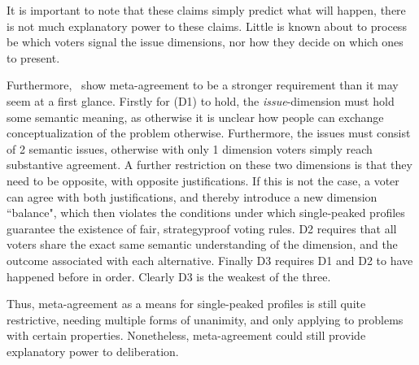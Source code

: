 It is important to note that these claims simply predict what will happen, there is not much explanatory power to these claims. Little is known about to process be which voters signal the issue dimensions, nor how they decide on which ones to present.

Furthermore,~\citet{ottonelliElusiveNotionMetaagreement2013} show meta-agreement to be a stronger requirement than it may seem at a first glance. Firstly for (D1) to hold, the \emph{issue}-dimension must hold some semantic meaning, as otherwise it is unclear how people can exchange conceptualization of the problem otherwise. Furthermore, the issues must consist of 2 semantic issues, otherwise with only 1 dimension voters simply reach substantive agreement. A further restriction on these two dimensions is that they need to be opposite, with opposite justifications. If this is not the case, a voter can agree with both justifications, and thereby introduce a new dimension ``balance", which then violates the conditions under which single-peaked profiles guarantee the existence of fair, strategyproof voting rules. D2 requires that all voters share the exact same semantic understanding of the dimension, and the outcome associated with each alternative. Finally D3 requires D1 and D2 to have happened before in order. Clearly D3 is the weakest of the three.

Thus, meta-agreement as a means for single-peaked profiles is still quite restrictive, needing multiple forms of unanimity, and only applying to problems with certain properties. Nonetheless,  meta-agreement could still provide explanatory power to deliberation.

